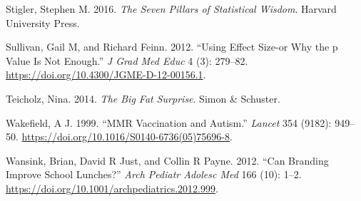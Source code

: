 \documentclass[
  12pt,
]{book}
\newlength{\cslhangindent}
\newlength{\cslentryspacingunit} %
\newenvironment{CSLReferences}[2] %
 {%
  \setlength{\parindent}{0pt}
  \ifodd #1
  \let\oldpar\par
  \def\par{\hangindent=\cslhangindent\oldpar}
  \fi
  \setlength{\parskip}{#2\cslentryspacingunit}
 }%
 {}
\begin{document}
\begin{CSLReferences}{1}{0}
\leavevmode{}%
Stigler, Stephen M. 2016. \emph{The Seven Pillars of Statistical Wisdom}. Harvard University Press.

\leavevmode{}%
Sullivan, Gail M, and Richard Feinn. 2012. {``Using Effect Size-or Why the p Value Is Not Enough.''} \emph{J Grad Med Educ} 4 (3): 279--82. \url{https://doi.org/10.4300/JGME-D-12-00156.1}.

\leavevmode{}%
Teicholz, Nina. 2014. \emph{The Big Fat Surprise}. Simon \& Schuster.

\leavevmode{}%
Wakefield, A J. 1999. {``MMR Vaccination and Autism.''} \emph{Lancet} 354 (9182): 949--50. \url{https://doi.org/10.1016/S0140-6736(05)75696-8}.

\leavevmode{}%
Wansink, Brian, David R Just, and Collin R Payne. 2012. {``Can Branding Improve School Lunches?''} \emph{Arch Pediatr Adolesc Med} 166 (10): 1--2. \url{https://doi.org/10.1001/archpediatrics.2012.999}.

\end{CSLReferences}
\end{document}
